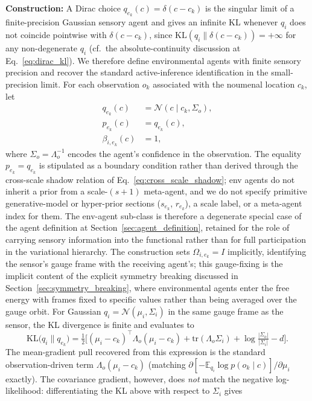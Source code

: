 \documentclass[11pt]{article}
\begin{document}
\textbf{Construction:} A Dirac choice $q_{e_k}(c) = \delta(c - c_k)$ is the singular limit of a finite-precision Gaussian sensory agent and gives an infinite KL whenever $q_i$ does not coincide pointwise with $\delta(c - c_k)$, since $\mathrm{KL}(q_i \| \delta(c - c_k)) = +\infty$ for any non-degenerate $q_i$ (cf.\ the absolute-continuity discussion at Eq.~\eqref{eq:dirac_kl}). We therefore define environmental agents with finite sensory precision and recover the standard active-inference identification in the small-precision limit. For each observation $o_k$ associated with the noumenal location $c_k$, let
\begin{align}
q_{e_k}(c) &= \mathcal{N}(c \mid c_k, \Sigma_o), \\
p_{e_k}(c) &= q_{e_k}(c), \\
\beta_{i,e_k}(c) &= 1,
\end{align}
where $\Sigma_o = \Lambda_o^{-1}$ encodes the agent's confidence in the observation. The equality $p_{e_k} = q_{e_k}$ is stipulated as a boundary condition rather than derived through the cross-scale shadow relation of Eq.~\eqref{eq:cross_scale_shadow}; env agents do not inherit a prior from a scale-$(s+1)$ meta-agent, and we do not specify primitive generative-model or hyper-prior sections ($s_{e_k}$, $r_{e_k}$), a scale label, or a meta-agent index for them. The env-agent sub-class is therefore a degenerate special case of the agent definition at Section~\ref{sec:agent_definition}, retained for the role of carrying sensory information into the functional rather than for full participation in the variational hierarchy. The construction sets $\Omega_{i,e_k} = I$ implicitly, identifying the sensor's gauge frame with the receiving agent's; this gauge-fixing is the implicit content of the explicit symmetry breaking discussed in Section~\ref{sec:symmetry_breaking}, where environmental agents enter the free energy with frames fixed to specific values rather than being averaged over the gauge orbit. For Gaussian $q_i = \mathcal{N}(\mu_i, \Sigma_i)$ in the same gauge frame as the sensor, the KL divergence is finite and evaluates to
\begin{equation}
\mathrm{KL}\big(q_i \| q_{e_k}\big) = \tfrac{1}{2}\big[(\mu_i - c_k)^\top \Lambda_o (\mu_i - c_k) + \mathrm{tr}(\Lambda_o \Sigma_i) + \log\tfrac{|\Sigma_o|}{|\Sigma_i|} - d\big].
\end{equation}
The mean-gradient pull recovered from this expression is the standard observation-driven term $\Lambda_o(\mu_i - c_k)$ (matching $\partial[-\mathbb{E}_{q_i}\log p(o_k \mid c)]/\partial\mu_i$ exactly). The covariance gradient, however, does \emph{not} match the negative log-likelihood: differentiating the KL above with respect to $\Sigma_i$ gives
\end{document}
